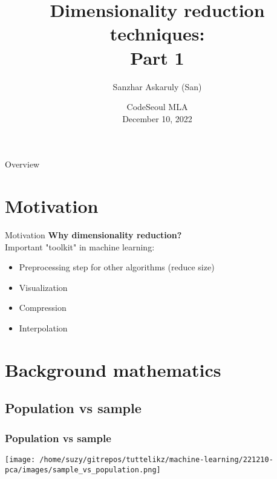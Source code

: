 \documentclass{beamer}
\title[CodeSeoul] %
  {Dimensionality reduction techniques: \\Part 1}
\author[Machine Learning Afternoons] %
  {Sanzhar Askaruly (San)}
\institute[] %
  { Ulsan National Institute of Science and Technology\newline
    Ph.D. Candidate in Biomedical Engineering}
\date[December 10]
{CodeSeoul MLA \\December 10, 2022}
\begin{document}
    \begin{frame}
    \titlepage %
    \end{frame}

    \begin{frame}{Overview}
      \tableofcontents
    \end{frame}
    
    \section{Motivation} %
    \begin{frame}{Motivation}
        \textbf{Why dimensionality reduction?}
        \bigskip
        \\ Important "toolkit" in machine learning:
        \begin{itemize}
            \item Preprocessing step for other algorithms (reduce size)
            \item Visualization
            \item Compression
            \item Interpolation
        \end{itemize}
    \end{frame}

    \section{Background mathematics}
    \subsection{Population vs sample}
    \begin{frame}
        \frametitle{Population vs sample}
        \begin{center}
            \texttt{[image: /home/suzy/gitrepos/tuttelikz/machine-learning/221210-pca/images/sample\_vs\_population.png]}
        \end{center}
    \end{frame}
\end{document}

